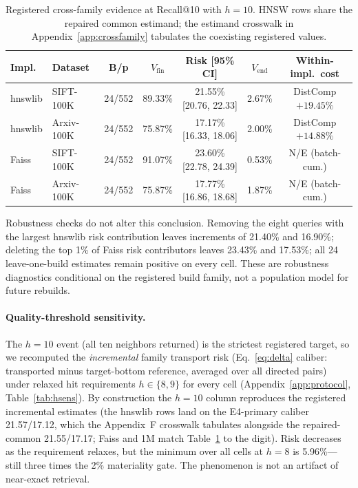 \documentclass{article}
\begin{document}
\begin{table}[t]
\centering
\caption{Registered cross-family evidence at Recall@10 with $h{=}10$. HNSW rows share the repaired common
estimand; the estimand crosswalk in Appendix~\ref{app:crossfamily} tabulates the coexisting registered
values.}
\label{tab:crossfamily}
\footnotesize
\setlength{\tabcolsep}{2.6pt}
\begin{tabular}{llccccc}
\toprule
Impl. & Dataset & B/p & $V_{\mathrm{fin}}$ & Risk [95\% CI] & $V_{\mathrm{end}}$ & Within-impl.\ cost \\
\midrule
hnswlib & SIFT-100K & 24/552 & 89.33\% & 21.55\% {\tiny[20.76, 22.33]} & 2.67\% & DistComp $+19.45\%$ \\
hnswlib & Arxiv-100K & 24/552 & 75.87\% & 17.17\% {\tiny[16.33, 18.06]} & 2.00\% & DistComp $+14.88\%$ \\
Faiss & SIFT-100K & 24/552 & 91.07\% & 23.60\% {\tiny[22.78, 24.39]} & 0.53\% & N/E (batch-cum.) \\
Faiss & Arxiv-100K & 24/552 & 75.87\% & 17.77\% {\tiny[16.86, 18.68]} & 1.87\% & N/E (batch-cum.) \\
\bottomrule
\end{tabular}
\end{table}

Robustness checks do not alter this conclusion. Removing the eight queries with the largest hnswlib risk
contribution leaves increments of 21.40\% and 16.90\%; deleting the top 1\% of Faiss risk contributors
leaves 23.43\% and 17.53\%; all 24 leave-one-build estimates remain positive on every cell. These are
robustness diagnostics conditional on the registered build family, not a population model for future
rebuilds.

\paragraph{Quality-threshold sensitivity.}
The $h{=}10$ event (all ten neighbors returned) is the strictest registered target, so we recomputed the
\emph{incremental} family transport risk (Eq.~\ref{eq:delta} caliber: transported minus target-bottom
reference, averaged over all directed pairs) under relaxed hit requirements $h\in\{8,9\}$ for every cell
(Appendix~\ref{app:protocol}, Table~\ref{tab:hsens}). By construction the $h{=}10$ column reproduces the registered incremental
estimates (the hnswlib rows land on the E4-primary caliber 21.57/17.12, which the Appendix~F crosswalk
tabulates alongside the repaired-common 21.55/17.17; Faiss and 1M match Table~\ref{tab:crossfamily} to
the digit). Risk decreases as the requirement relaxes, but the minimum over all cells at $h{=}8$ is
5.96\%---still three times the 2\% materiality gate. The phenomenon is not an artifact of near-exact
retrieval.
\end{document}
